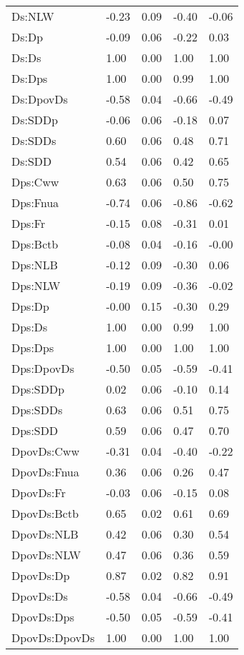 \begin{center}
\begin{longtable}{|p{0.9in}|p{0.7in}|p{0.7in}|p{0.7in}|p{0.7in}|}
  Ds:NLW & -0.23 & 0.09 & -0.40 & -0.06 \\ 
  Ds:Dp & -0.09 & 0.06 & -0.22 & 0.03 \\ 
  Ds:Ds & 1.00 & 0.00 & 1.00 & 1.00 \\ 
  Ds:Dps & 1.00 & 0.00 & 0.99 & 1.00 \\ 
  Ds:DpovDs & -0.58 & 0.04 & -0.66 & -0.49 \\ 
  Ds:SDDp & -0.06 & 0.06 & -0.18 & 0.07 \\ 
  Ds:SDDs & 0.60 & 0.06 & 0.48 & 0.71 \\ 
  Ds:SDD & 0.54 & 0.06 & 0.42 & 0.65 \\ 
  Dps:Cww & 0.63 & 0.06 & 0.50 & 0.75 \\ 
  Dps:Fnua & -0.74 & 0.06 & -0.86 & -0.62 \\ 
  Dps:Fr & -0.15 & 0.08 & -0.31 & 0.01 \\ 
  Dps:Bctb & -0.08 & 0.04 & -0.16 & -0.00 \\ 
  Dps:NLB & -0.12 & 0.09 & -0.30 & 0.06 \\ 
  Dps:NLW & -0.19 & 0.09 & -0.36 & -0.02 \\ 
  Dps:Dp & -0.00 & 0.15 & -0.30 & 0.29 \\ 
  Dps:Ds & 1.00 & 0.00 & 0.99 & 1.00 \\ 
  Dps:Dps & 1.00 & 0.00 & 1.00 & 1.00 \\ 
  Dps:DpovDs & -0.50 & 0.05 & -0.59 & -0.41 \\ 
  Dps:SDDp & 0.02 & 0.06 & -0.10 & 0.14 \\ 
  Dps:SDDs & 0.63 & 0.06 & 0.51 & 0.75 \\ 
  Dps:SDD & 0.59 & 0.06 & 0.47 & 0.70 \\ 
  DpovDs:Cww & -0.31 & 0.04 & -0.40 & -0.22 \\ 
  DpovDs:Fnua & 0.36 & 0.06 & 0.26 & 0.47 \\ 
  DpovDs:Fr & -0.03 & 0.06 & -0.15 & 0.08 \\ 
  DpovDs:Bctb & 0.65 & 0.02 & 0.61 & 0.69 \\ 
  DpovDs:NLB & 0.42 & 0.06 & 0.30 & 0.54 \\ 
  DpovDs:NLW & 0.47 & 0.06 & 0.36 & 0.59 \\ 
  DpovDs:Dp & 0.87 & 0.02 & 0.82 & 0.91 \\ 
  DpovDs:Ds & -0.58 & 0.04 & -0.66 & -0.49 \\ 
  DpovDs:Dps & -0.50 & 0.05 & -0.59 & -0.41 \\ 
  DpovDs:DpovDs & 1.00 & 0.00 & 1.00 & 1.00 \\ 

\end{longtable}
\end{center}
